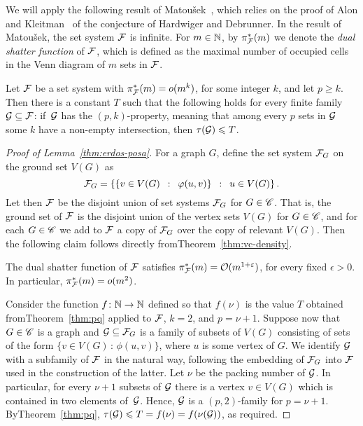 We will apply the following result of Matou{\v s}ek~\cite{Matousek:2004:BVI:1005787.1005789},
which relies on the proof of Alon and Kleitman~\cite{ALON1992103} of the conjecture of Hardwiger and Debrunner. 
In the result of Matou{\v s}ek, the set system $\cal F$ is infinite. For $m\in \N$, by $\pi_{\cal F}^*(m)$ we denote the \emph{dual shatter function} of $\cal F$, which is defined as the maximal number 
of occupied cells in the Venn diagram of $m$ sets in $\cal F$.


\begin{theorem}\label{thm:pq}
	Let $\cal F$ be a set system with $\pi^*_{\cal F}(m)=o(m^k)$,
	for some integer $k$, and let $p\ge k$.
	Then there is a constant $T$ such that the following holds for every finite family $\cal G\subset \cal F$: 
	if~$\cal G$ has the $(p,k)$-property, meaning that 
	among every $p$ sets in $\cal G$ some $k$ have a non-empty intersection, then $\tau ({\cal G})\le T$.
\end{theorem}
\begin{proof}[Proof of Lemma~\ref{thm:erdos-posa}]
For a graph $G$, define the set system ${\cal F}_G$ on the ground set $V(G)$ as
$${\cal F}_G = \setof{\setof{v\in V(G)}{\phi(u, v)}}{u\in V(G)}.$$
Let then $\cal F$ be the disjoint union of set systems ${\cal F}_G$ for $G\in \CCC$. That is, 
the ground set of $\cal F$ is the disjoint union of the vertex sets $V(G)$ for $G\in \CCC$, and for each $G\in \CCC$ we add to ${\cal F}$
a copy of ${\cal F}_G$ over the copy of relevant $V(G)$.
Then the following claim follows directly fromTheorem~\ref{thm:vc-density}.

\begin{claim}
The dual shatter function of $\cal F$ satisfies $\pi^*_{\cal F}(m)=\Oof(m^{1+\epsilon})$,
for every fixed $\epsilon>0$. In particular, $\pi^*_{\cal F}(m)=o(m^{2})$.
\end{claim}

Consider the function $f\from \N \to \N$ defined so that $f(\nu)$ is the value $T$ obtained fromTheorem~\ref{thm:pq} applied to $\cal F$, $k=2$, and $p=\nu+1$.
Suppose now that $G\in \CCC$ is a graph and $\GGG\subseteq \FFF_G$
is a family of subsets of $V(G)$ consisting of sets of the form $\{v\in V(G)\,\colon\,\phi(u,v)\}$, where $u$ is some vertex of $G$.
We identify $\GGG$ with a subfamily of $\FFF$ in the natural way, following the embedding of $\FFF_G$ into $\FFF$ used in the construction of the latter.
Let $\nu$ be the packing number of $\GGG$.
In particular, for every $\nu+1$ subsets of $\GGG$
there is a vertex $v\in V(G)$
which is contained in two elements of~$\GGG$.
Hence, $\GGG$ is a $(p,2)$-family for $p=\nu+1$.
ByTheorem~\ref{thm:pq}, $\tau(\GGG)\le T=f(\nu)=f(\nu(\GGG))$, as required.
\end{proof}
